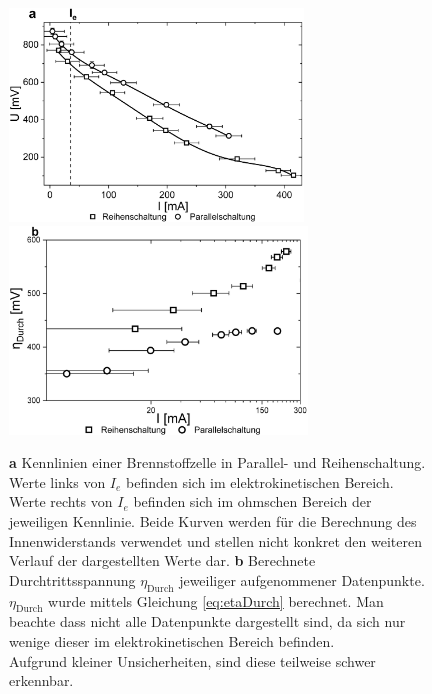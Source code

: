 \documentclass[a4paper,usenatbib]{aspdoc}
\begin{document}
            
                \begin{figure}
                    \centering
                    \includegraphics[width=78mm]{graphs/brennKenn1.png}
                    \includegraphics[width=79mm]{graphs/zelleChar1.png}
                    \caption{
                        \textbf{a} Kennlinien einer Brennstoffzelle in Parallel- und Reihenschaltung. Werte links von $I_e$ befinden sich im elektrokinetischen Bereich. Werte rechts von $I_e$ befinden sich im ohmschen Bereich der jeweiligen Kennlinie. Beide Kurven werden für die Berechnung des Innenwiderstands verwendet und stellen nicht konkret den weiteren Verlauf der dargestellten Werte dar.
                        \textbf{b} Berechnete Durchtrittsspannung $\eta_{\mathrm{Durch}}$ jeweiliger aufgenommener Datenpunkte. $\eta_{\mathrm{Durch}}$ wurde mittels Gleichung \ref{eq:etaDurch} berechnet. Man beachte dass nicht alle Datenpunkte dargestellt sind, da sich nur wenige dieser im elektrokinetischen Bereich befinden.\\
                        Aufgrund kleiner Unsicherheiten, sind diese teilweise schwer erkennbar.
                    }
                    \label{fig:brennVerbrauchRate}
                \end{figure}
        
        
\end{document}
